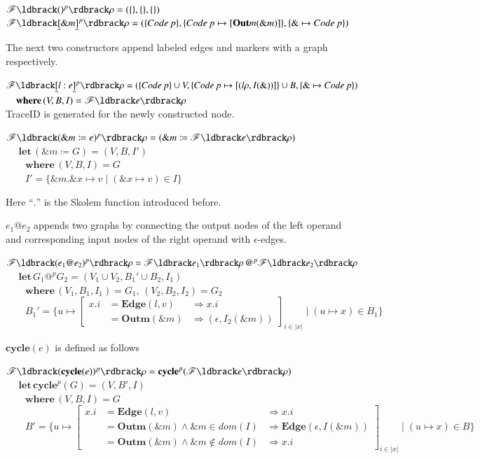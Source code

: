 \documentclass{llncs}
\newcommand{\Lef}{\underline{[}}
\newcommand{\Rig}{\underline{]}}
\begin{document}
$\mathscr{F}\ldbrack()^p \rdbrack\rho=(\{\},\{\},\{\})$\\


$\mathscr{F}\ldbrack\Lef \&m\Rig^p\rdbrack\rho=(\{Code\,p\},\{Code\,p\mapsto[\mathbf{Out}m(\&m)]\},\{\&\mapsto Code\,p\})$

The next two constructors append labeled edges and markers with a graph respectively.

$\mathscr{F}\ldbrack\Lef l:e\Rig^p\rdbrack\rho=(\{Code\,p\}\cup V,\{Code\,p\mapsto[(l\rho,I(\&))]\}\cup B,\{\&\mapsto Code\,p\})$\\
$\mbox{~~~~}\mathbf{where}\,(V,B,I)=\mathscr{F}\ldbrack e\rdbrack\rho$\\

TraceID is generated for the newly constructed node.

$\mathscr{F}\ldbrack(\&m\coloneqq e)^p\rdbrack\rho=(\&m\coloneqq \mathscr{F}\ldbrack e\rdbrack\rho)$\\
$\mbox{~~~~}\mathbf{let}\,(\&m\coloneqq G)=(V,B,I')$\\
$\mbox{~~~~~~}\mathbf{where}\,(V,B,I)=G$\\
$\mbox{~~~~~~}I'=\{\&m.\&x\mapsto v\mid(\&x\mapsto v)\in I\}$

Here ``$.$'' is the Skolem function introduced before.

$e_1@ e_2$ appends two graphs by connecting the output nodes of the left operand and corresponding input nodes of the right operand with $\epsilon$-edges.

$\mathscr{F}\ldbrack(e_1@ e_2)^p \rdbrack\rho=\mathscr{F}\ldbrack e_1\rdbrack\rho\, @^p\mathscr{F}\ldbrack e_2\rdbrack\rho$\\
$\mbox{~~~~}\mathbf{let}\,G_1@^pG_2=(V_1\cup V_2,B_1'\cup B_2,I_1)$\\
$\mbox{~~~~~~}\mathbf{where}\,(V_1,B_1,I_1)=G_1,\,(V_2,B_2,I_2)=G_2$\\
$\mbox{~~~~~~}B_{1}'=\{u\mapsto\left[
	\begin{array}{lll}
	x.i	&=\mathbf{Edge}(l,v)	&\Rightarrow x.i\\
		&=\mathbf{Outm}(\&m)	&\Rightarrow (\epsilon,I_2(\&m))
	\end{array}\right]_{i\in |x|}\mid (u\mapsto x)\in B_1\}$

$\mathbf{cycle}(e)$ is defined as follows

$\mathscr{F}\ldbrack(\mathbf{cycle}(e))^p \rdbrack\rho=\mathbf{cycle}^p(\mathscr{F}\ldbrack e \rdbrack\rho)$\\
$\mbox{~~~~}\mathbf{let}\,\mathbf{cycle}^p(G)=(V,B',I)$\\
$\mbox{~~~~~~}\mathbf{where}\,(V,B,I)=G$\\
$\mbox{~~~~~~}B'=\{u\mapsto\left[
	\begin{array}{lll}
	x.i	&=\mathbf{Edge}(l,v)	&\Rightarrow x.i\\
		&=\mathbf{Outm}(\&m)\wedge\&m\in dom(I)		&\Rightarrow \mathbf{Edge}(\epsilon,I(\&m))\\
		&=\mathbf{Outm}(\&m)\wedge\&m\notin dom(I)	&\Rightarrow x.i
	\end{array}\right]_{i\in |x|}\mid (u\mapsto x)\in B\}$
\end{document}
